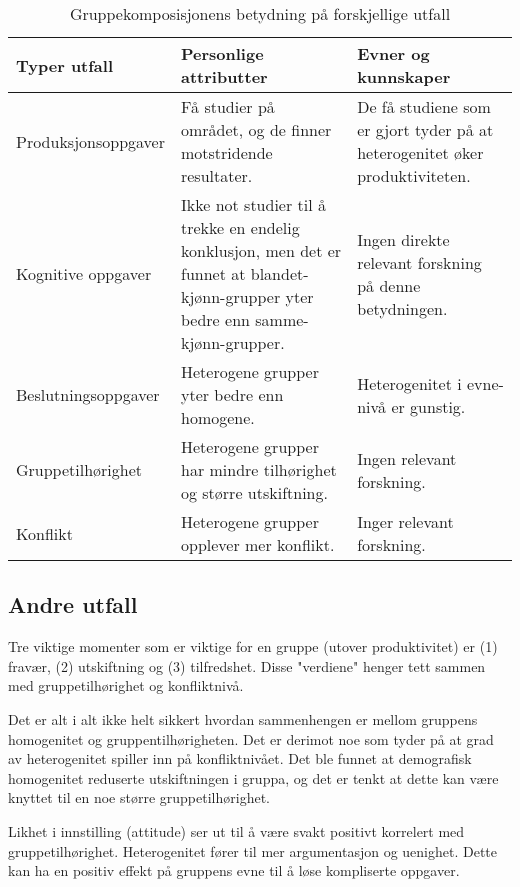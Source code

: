 \documentclass[11pt]{article}
\begin{document}
				\begin{center}
					\begin{table}
						\begin{tabular}{l | p{5cm} | p{5cm} }
							\hline
							\textbf{Typer utfall} & \textbf{Personlige attributter} & \textbf{Evner og kunnskaper} \\
							\hline
							Produksjonsoppgaver & Få studier på området, og de finner motstridende resultater. & De få studiene som er gjort tyder på at heterogenitet øker produktiviteten. \\ \hline
							Kognitive oppgaver & Ikke not studier til å trekke en endelig konklusjon, men det er funnet at blandet-kjønn-grupper yter bedre enn samme-kjønn-grupper. & Ingen direkte relevant forskning på denne betydningen. \\ \hline
							Beslutningsoppgaver & Heterogene grupper yter bedre enn homogene. & Heterogenitet i evne-nivå er gunstig. \\ \hline
							Gruppetilhørighet & Heterogene grupper har mindre tilhørighet og større utskiftning. & Ingen relevant forskning. \\ \hline
							Konflikt & Heterogene grupper opplever mer konflikt. & Inger relevant forskning. \\ \hline
						\end{tabular}
						\caption{Gruppekomposisjonens betydning på forskjellige utfall}
						\label{tab:gruppeKomposisjon}
					\end{table}
				\end{center}

		\subsection{Andre utfall}
			Tre viktige momenter som er viktige for en gruppe (utover produktivitet) er (1) fravær, (2) utskiftning og (3) tilfredshet. Disse "verdiene" henger tett sammen med gruppetilhørighet og konfliktnivå.
			\newline			
			
			Det er alt i alt ikke helt sikkert hvordan sammenhengen er mellom gruppens homogenitet og gruppentilhørigheten. Det er derimot noe som tyder på at grad av heterogenitet spiller inn på konfliktnivået. Det ble funnet at demografisk homogenitet reduserte utskiftningen i gruppa, og det er tenkt at dette kan være knyttet til en noe større gruppetilhørighet.
			
			Likhet i innstilling (attitude) ser ut til å være svakt positivt korrelert med gruppetilhørighet. Heterogenitet fører til mer argumentasjon og uenighet. Dette kan ha en positiv effekt på gruppens evne til å løse kompliserte oppgaver.
			
\end{document}
